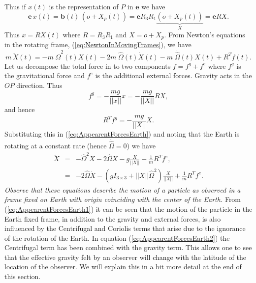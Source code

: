 \documentclass[graybox,envcountchap,sectrefs]{svmonoMuga}
\begin{document}
Thus if $x(t)$ is the representation of $P$ in $\mathbf{e}$ we have
\[
\mathbf{e}\,x(t)=\mathbf{b}(t)\,(o+X_p(t))=\mathbf{e}R_3R_1\underbrace{(o+X_p(t))}_{X}=\mathbf{e}RX.
\]
Thus $x=RX(t)$
where $R=R_3R_1$ and $X=o+X_p$.
From Newton's equations in the rotating frame, (\ref{eq:NewtonInMovingFrames}), we have
\begin{equation}\label{eq:AppearentForcesEarth}
m\, \ddot{X}(t)=-m\;\widehat{\Omega}^2(t) X(t)-2m\;\widehat{\Omega}(t)\dot{X}(t)- m\;\dot{\widehat{\Omega}}(t) X(t)+R^Tf(t).
\end{equation}
Let us decompose the total force in to two components $f=f^g+f^e$ where $f^g$ is the gravitational force and $f^e$ is the additional external forces.
Gravity acts in the $OP$ direction. Thus
\[
f^g=-\frac{mg}{||x||}x=-\frac{mg}{||X||}RX,
\]
and hence
\[
R^Tf^g=-\frac{mg}{||X||}X.
\]
Substituting this in (\ref{eq:AppearentForcesEarth}) and noting that the Earth is rotating at a constant rate (hence $\dot{\widehat{\Omega}}=0$)  we have
\begin{eqnarray}
\ddot{X} &=&-\widehat{\Omega}^2X-2\widehat{\Omega}\dot{X}-g\frac{X}{||X||}+\frac{1}{m}R^Tf^e,\label{eq:AppearentForcesEarth1}\\
 &=&-2\widehat{\Omega}\dot{X}-\left(gI_{3\times 3}+||X||\widehat{\Omega}^2 \right)\frac{X}{||X||}+\frac{1}{m}R^Tf^e.\label{eq:AppearentForcesEarth2}
\end{eqnarray}
\emph{Observe that these equations describe the motion of a particle as observed in a frame fixed on Earth with origin coinciding with the center of the Earth.}
From (\ref{eq:AppearentForcesEarth1}) it can be seen that the motion of the particle in the Earth fixed frame, in addition to the gravity and external forces, is also influenced by the 
Centrifugal and Coriolis terms that arise due to the ignorance of the rotation of the Earth. In equation (\ref{eq:AppearentForcesEarth2}) the Centrifugal term has been combined with the gravity term. 
This allows one to see that the effective gravity felt by an observer will change with the latitude of the location of the observer. We will explain this in a bit more detail at the end of this section.
\end{document}
